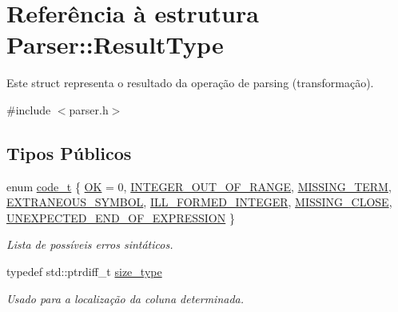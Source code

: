 \hypertarget{structParser_1_1ResultType}{}\section{Referência à estrutura Parser\+:\+:Result\+Type}
\label{structParser_1_1ResultType}


Este struct representa o resultado da operação de parsing (transformação).  




{\ttfamily \#include $<$parser.\+h$>$}

\subsection*{Tipos Públicos}
\begin{DoxyCompactItemize}
\item 
enum \hyperlink{structParser_1_1ResultType_ac63a3ce34d7a6a119b1902372116d457}{code\+\_\+t} \{ \newline
\hyperlink{structParser_1_1ResultType_ac63a3ce34d7a6a119b1902372116d457a0125be86217a5d0cdad8f818c7e2fde0}{OK} = 0, 
\hyperlink{structParser_1_1ResultType_ac63a3ce34d7a6a119b1902372116d457af9de255781fa9d894aef9642ebceb791}{I\+N\+T\+E\+G\+E\+R\+\_\+\+O\+U\+T\+\_\+\+O\+F\+\_\+\+R\+A\+N\+GE}, 
\hyperlink{structParser_1_1ResultType_ac63a3ce34d7a6a119b1902372116d457af91c77cd7f544ac5940fd7e437e960e8}{M\+I\+S\+S\+I\+N\+G\+\_\+\+T\+E\+RM}, 
\hyperlink{structParser_1_1ResultType_ac63a3ce34d7a6a119b1902372116d457aa20035f93278146ba5e9ef378cb3bead}{E\+X\+T\+R\+A\+N\+E\+O\+U\+S\+\_\+\+S\+Y\+M\+B\+OL}, 
\newline
\hyperlink{structParser_1_1ResultType_ac63a3ce34d7a6a119b1902372116d457a32e1d7a7795bf11d5e226fc1170b95f8}{I\+L\+L\+\_\+\+F\+O\+R\+M\+E\+D\+\_\+\+I\+N\+T\+E\+G\+ER}, 
\hyperlink{structParser_1_1ResultType_ac63a3ce34d7a6a119b1902372116d457a55ff38b0497bb788e4d85d8b671f57a1}{M\+I\+S\+S\+I\+N\+G\+\_\+\+C\+L\+O\+SE}, 
\hyperlink{structParser_1_1ResultType_ac63a3ce34d7a6a119b1902372116d457a00b416ad0baaf9af4d89326038a88aed}{U\+N\+E\+X\+P\+E\+C\+T\+E\+D\+\_\+\+E\+N\+D\+\_\+\+O\+F\+\_\+\+E\+X\+P\+R\+E\+S\+S\+I\+ON}
 \}\begin{DoxyCompactList}\small\item\em Lista de possíveis erros sintáticos. \end{DoxyCompactList}
\item 
typedef std\+::ptrdiff\+\_\+t \hyperlink{structParser_1_1ResultType_a8f110ce090aad3f4016d241aaef768db}{size\+\_\+type}
\begin{DoxyCompactList}\small\item\em Usado para a localização da coluna determinada. \end{DoxyCompactList}\end{DoxyCompactItemize}
